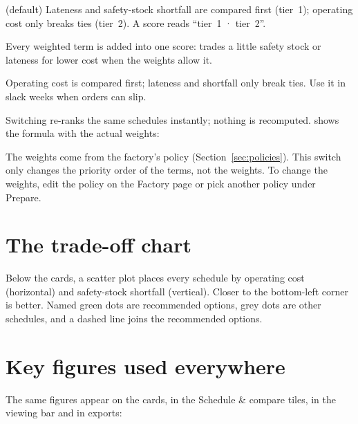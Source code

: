 \begin{description}[style=nextline, leftmargin=1.2em, font=\bfseries\color{brand}]
  \item[Service first] (default) Lateness and safety-stock shortfall are compared first (tier~1); operating
        cost only breaks ties (tier~2). A score reads ``tier~1 · tier~2''.
  \item[Balanced] Every weighted term is added into one score: trades a little safety stock or lateness for
        lower cost when the weights allow it.
  \item[Cost first] Operating cost is compared first; lateness and shortfall only break ties. Use it in slack
        weeks when orders can slip.
\end{description}

Switching re-ranks the same schedules instantly; nothing is recomputed.  shows the formula with the actual weights:


\begin{note}
The weights come from the factory's policy (Section~\ref{sec:policies}). This switch only changes the priority
order of the terms, not the weights. To change the weights, edit the policy on the Factory page or pick
another policy under Prepare.
\end{note}

\section{The trade-off chart}

Below the cards, a scatter plot places every schedule by operating cost (horizontal) and safety-stock
shortfall (vertical). Closer to the bottom-left corner is better. Named green dots are recommended options,
grey dots are other schedules, and a dashed line joins the recommended options.


\section{Key figures used everywhere}\label{sec:kpis}

The same figures appear on the cards, in the Schedule \& compare tiles, in the viewing bar and in exports:

